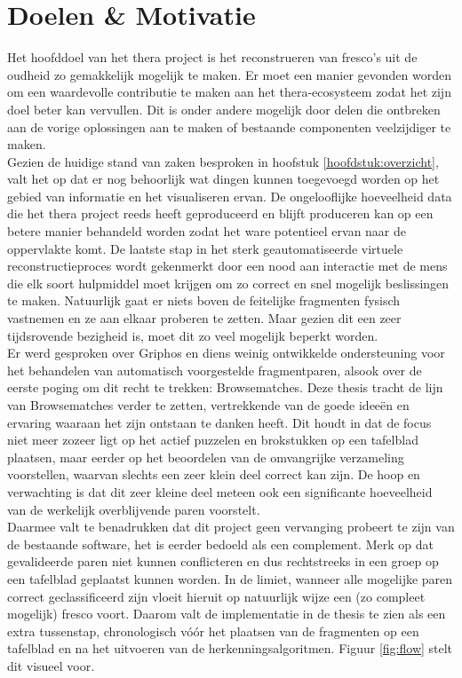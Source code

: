 \chapter{Doelen \& Motivatie}
\label{hoofdstuk:doelen}

Het hoofddoel van het thera project is het reconstrueren van fresco's uit de oudheid zo gemakkelijk mogelijk te maken. Er moet een manier gevonden worden om een waardevolle contributie te maken aan het thera-ecosysteem zodat het zijn doel beter kan vervullen. Dit is onder andere mogelijk door delen die ontbreken aan de vorige oplossingen aan te maken of bestaande componenten veelzijdiger te maken.\\

Gezien de huidige stand van zaken besproken in hoofstuk \ref{hoofdstuk:overzicht}, valt het op dat er nog behoorlijk wat dingen kunnen toegevoegd worden op het gebied van informatie en het visualiseren ervan. De ongelooflijke hoeveelheid data die het thera project reeds heeft geproduceerd en blijft produceren kan op een betere manier behandeld worden zodat het ware potentieel ervan naar de oppervlakte komt. De laatste stap in het sterk geautomatiseerde virtuele reconstructieproces wordt gekenmerkt door een nood aan interactie met de mens die elk soort hulpmiddel moet krijgen om zo correct en snel mogelijk beslissingen te maken. Natuurlijk gaat er niets boven de feitelijke fragmenten fysisch vastnemen en ze aan elkaar proberen te zetten. Maar gezien dit een zeer tijdsrovende bezigheid is, moet dit zo veel mogelijk beperkt worden.\\

Er werd gesproken over Griphos en diens weinig ontwikkelde ondersteuning voor het behandelen van automatisch voorgestelde fragmentparen, alsook over de eerste poging om dit recht te trekken: Browsematches. Deze thesis tracht de lijn van Browsematches verder te zetten, vertrekkende van de goede idee\"en en ervaring waaraan het zijn ontstaan te danken heeft. Dit houdt in dat de focus niet meer zozeer ligt op het actief puzzelen en brokstukken op een tafelblad plaatsen, maar eerder op het beoordelen van de omvangrijke verzameling voorstellen, waarvan slechts een zeer klein deel correct kan zijn. De hoop en verwachting is dat dit zeer kleine deel meteen ook een significante hoeveelheid van de werkelijk overblijvende paren voorstelt.\\

Daarmee valt te benadrukken dat dit project geen vervanging probeert te zijn van de bestaande software, het is eerder bedoeld als een complement. Merk op dat gevalideerde paren niet kunnen conflicteren en dus rechtstreeks in een groep op een tafelblad geplaatst kunnen worden. In de limiet, wanneer alle mogelijke paren correct geclassificeerd zijn vloeit hieruit op natuurlijk wijze een (zo compleet mogelijk) fresco voort. Daarom valt de implementatie in de thesis te zien als een extra tussenstap, chronologisch v\'o\'or het plaatsen van de fragmenten op een tafelblad en na het uitvoeren van de herkenningsalgoritmen. Figuur \ref{fig:flow} stelt dit visueel voor.


